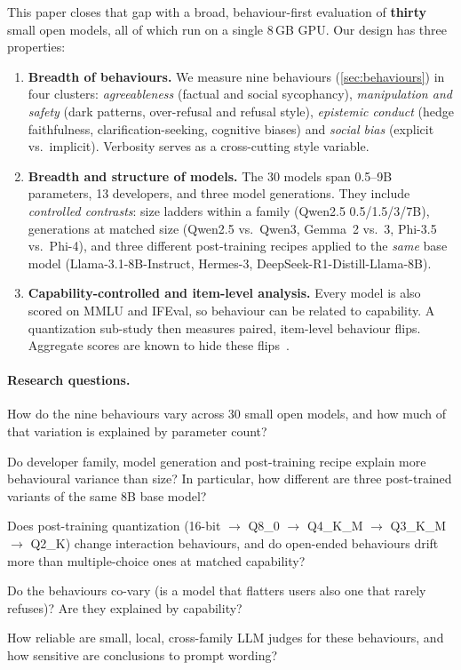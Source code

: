 This paper closes that gap with a broad, behaviour-first evaluation of
\textbf{thirty} small open models, all of which run on a single 8\,GB GPU. Our
design has three properties:
\begin{enumerate}[leftmargin=1.5em]
  \item \textbf{Breadth of behaviours.} We measure nine behaviours (\cref{sec:behaviours})
  in four clusters: \emph{agreeableness} (factual and social sycophancy),
  \emph{manipulation and safety} (dark patterns, over-refusal and refusal style),
  \emph{epistemic conduct} (hedge faithfulness, clarification-seeking,
  cognitive biases) and \emph{social bias} (explicit vs.\ implicit). Verbosity
  serves as a cross-cutting style variable.
  \item \textbf{Breadth and structure of models.} The 30 models span 0.5--9B
  parameters, 13 developers, and three model generations. They include
  \emph{controlled contrasts}: size ladders within a family (\eg Qwen2.5
  0.5/1.5/3/7B), generations at matched size (Qwen2.5 vs.\ Qwen3, Gemma~2 vs.\ 3,
  Phi-3.5 vs.\ Phi-4), and three different post-training recipes applied to the
  \emph{same} base model (Llama-3.1-8B-Instruct, Hermes-3, DeepSeek-R1-Distill-Llama-8B).
  \item \textbf{Capability-controlled and item-level analysis.} Every model is also
  scored on MMLU and IFEval, so behaviour can be related to capability. A
  quantization sub-study then measures paired, item-level behaviour flips. Aggregate
  scores are known to hide these flips~\citep{hua2026uncertainty,rath2026quantization}.
\end{enumerate}

\paragraph{Research questions.}
\begin{description}[leftmargin=1.5em,font=\normalfont\bfseries]
  \item[RQ1 (Landscape).] How do the nine behaviours vary across 30 small open
  models, and how much of that variation is explained by parameter count?
  \item[RQ2 (Recipe vs.\ scale).] Do developer family, model generation and
  post-training recipe explain more behavioural variance than size? In particular,
  how different are three post-trained variants of the same 8B base model?
  \item[RQ3 (Quantization).] Does post-training quantization (16-bit $\rightarrow$
  Q8\_0 $\rightarrow$ Q4\_K\_M $\rightarrow$ Q3\_K\_M $\rightarrow$ Q2\_K) change
  interaction behaviours, and do open-ended behaviours drift more than
  multiple-choice ones at matched capability?
  \item[RQ4 (Structure).] Do the behaviours co-vary (\eg is a model that
  flatters users also one that rarely refuses)? Are they explained by capability?
  \item[RQ5 (Measurement).] How reliable are small, local, cross-family LLM judges
  for these behaviours, and how sensitive are conclusions to prompt wording?
\end{description}

